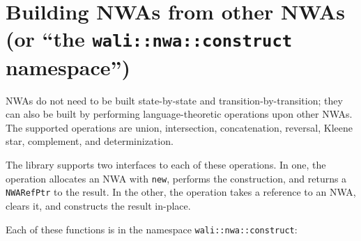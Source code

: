\section{Building NWAs from other NWAs (or ``the \texttt{wali::nwa::construct} namespace'')}
\label{Se:Building NWAs}

NWAs do not need to be built state-by-state and transition-by-transition;
they can also be built by performing language-theoretic operations upon
other NWAs. The supported operations are union, intersection, concatenation,
reversal, Kleene star, complement, and determinization.

The library supports two interfaces to each of these operations. In one, the
operation allocates an NWA with \texttt{new}, performs the construction, and
returns a \texttt{NWARefPtr} to the result.  In the other, the operation takes
a reference to an NWA, clears it, and constructs the result in-place.

Each of these functions is in the namespace \texttt{wali::nwa::construct}:

